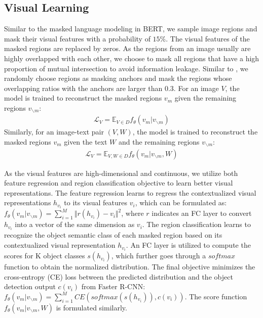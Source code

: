 \documentclass[11pt,a4paper]{article}
\begin{document}
\subsection{Visual Learning}
\label{ssec:vis}

Similar to the masked language modeling in BERT, we sample image regions and mask their visual features with a probability of $15\%$.
The visual features of the masked regions are replaced by zeros.
As the regions from an image usually are highly overlapped with each other, we choose to mask all regions that have a high proportion of mutual intersection to avoid information leakage.
Similar to \citet{lin2020interbert}, we randomly choose regions as masking anchors and mask the regions whose overlapping ratios with the anchors are larger than 0.3.
For an image $V$, the model is trained to reconstruct the masked regions $v_m$ given the remaining regions $v_{\backslash m}$:
\begin{equation}
\begin{aligned}
    \mathcal{L}_{V} = \mathbb{E}_{V \in D} f_{\theta} (v_m|v_{\backslash m})
\end{aligned}
\label{eq1}
\end{equation}
Similarly, for an image-text pair $(V,W)$, the model is trained to reconstruct the masked regions $v_m$ given the text $W$ and the remaining regions $v_{\backslash m}$:
\begin{equation}
\begin{aligned}
    \mathcal{L}_{V} = \mathbb{E}_{V,W \in D} f_{\theta} (v_m|v_{\backslash m}, W)
\end{aligned}
\label{eq1}
\end{equation}

As the visual features are high-dimensional and continuous, we utilize both feature regression and region classification objective to learn better visual representations.
The feature regression learns to regress the contextualized visual representations $h_{v_i}$ to its visual features $v_i$, which can be formulated as: $f_{\theta} (v_m|v_{\backslash m}) = \sum_{i=1}^{M} \Vert r(h_{v_i}) - v_i \Vert^2$, where $r$ indicates an FC layer to convert $h_{v_i}$ into a vector of the same dimension as $v_i$.
The region classification learns to recognize the object semantic class of each masked region based on its contextualized visual representation $h_{v_i}$.
An FC layer is utilized to compute the scores for K object classes $s(h_{v_i})$, which further goes through a $softmax$ function to obtain the normalized distribution.
The final objective minimizes the cross-entropy (CE) loss between the predicted distribution and the object detection output $c(v_i)$ from Faster R-CNN: $f_{\theta} (v_m|v_{\backslash m}) = \sum_{i=1}^{M} CE(softmax(s(h_{v_i})), c(v_i))$.
The score function $f_{\theta} (v_m|v_{\backslash m},W)$ is formulated similarly.
\end{document}
